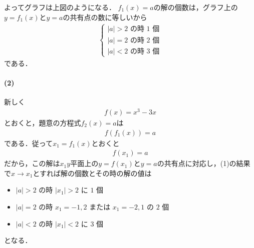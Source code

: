 \documentclass[../../main.tex]{subfiles}
\begin{document}
よってグラフは上図のようになる．
$f_1(x)=a$の解の個数は，グラフ上の$y=f_1(x)$と$y=a$の共有点の数に等しいから
\begin{align}
  \begin{cases}
    |a| > 2 \text{ の時 } 1 \text{ 個} \\
    |a| = 2 \text{ の時 } 2 \text{ 個} \\
    |a| < 2 \text{ の時 } 3 \text{ 個}
  \end{cases}
\end{align}
である．

\paragraph{(2)}

新しく
\begin{align}
  f(x) = x^3 - 3x
\end{align}
とおくと，題意の方程式$f_2(x)=a$は
\begin{align}
  f(f_1(x)) = a \label{eq:1}
\end{align}
である．従って$x_1=f_1(x)$とおくと
\begin{align}
  f(x_1) = a
\end{align}
だから，この解は$x_1y$平面上の$y=f(x_1)$と$y=a$の共有点に対応し，(1)の結果で$x\to x_1$とすれば解の個数とその時の解の値は
\begin{itemize}
  \item  $|a| > 2$ の時 $|x_1|>2$ に $1$ 個 \\
  \item  $|a| = 2$ の時 $x_1=-1,2$ または $x_1=-2,1$ の $2$ 個 \\
  \item  $|a| < 2$ の時 $|x_1|<2$ に $3$ 個
\end{itemize}
となる．
\end{document}
